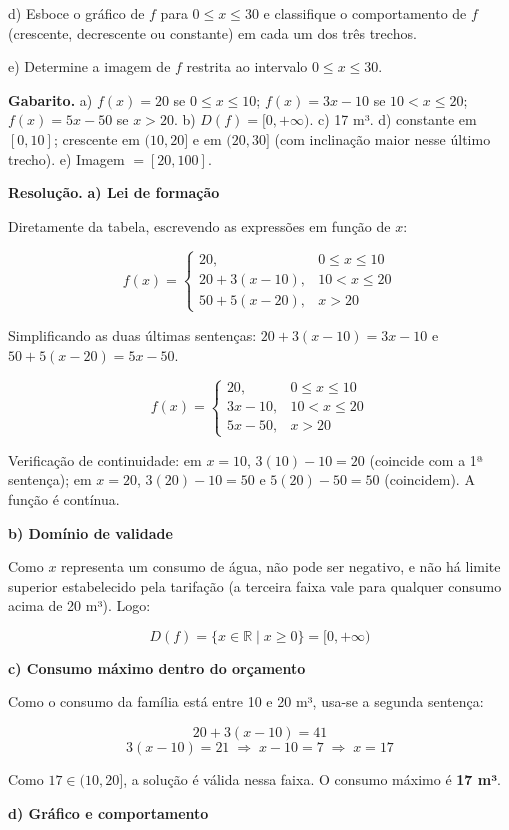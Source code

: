 \documentclass[11pt,a4paper]{article}
\begin{document}
d) Esboce o gráfico de $f$ para $0 \le x \le 30$ e classifique o comportamento de $f$ (crescente, decrescente ou constante) em cada um dos três trechos.

e) Determine a imagem de $f$ restrita ao intervalo $0 \le x \le 30$.

\textbf{Gabarito.} a) $f(x)=20$ se $0\le x\le 10$; $f(x)=3x-10$ se $10<x\le 20$; $f(x)=5x-50$ se $x>20$. b) $D(f)=[0,+\infty)$. c) 17 m³. d) constante em $[0,10]$; crescente em $(10,20]$ e em $(20,30]$ (com inclinação maior nesse último trecho). e) Imagem $=[20,100]$.

\textbf{Resolução.} \textbf{a) Lei de formação}

Diretamente da tabela, escrevendo as expressões em função de $x$:

$$f(x)=\begin{cases}20, & 0\le x\le 10\\[2pt] 20+3(x-10), & 10< x\le 20\\[2pt] 50+5(x-20), & x> 20\end{cases}$$

Simplificando as duas últimas sentenças: $20+3(x-10)=3x-10$ e $50+5(x-20)=5x-50$.

$$f(x)=\begin{cases}20, & 0\le x\le 10\\ 3x-10, & 10< x\le 20\\ 5x-50, & x> 20\end{cases}$$

Verificação de continuidade: em $x=10$, $3(10)-10=20$ (coincide com a 1ª sentença); em $x=20$, $3(20)-10=50$ e $5(20)-50=50$ (coincidem). A função é contínua.

\textbf{b) Domínio de validade}

Como $x$ representa um consumo de água, não pode ser negativo, e não há limite superior estabelecido pela tarifação (a terceira faixa vale para qualquer consumo acima de 20 m³). Logo:

$$D(f) = \{x \in \mathbb{R} \mid x \ge 0\} = [0, +\infty)$$

\textbf{c) Consumo máximo dentro do orçamento}

Como o consumo da família está entre 10 e 20 m³, usa-se a segunda sentença:

$$20+3(x-10)=41$$
$$3(x-10)=21 \;\Rightarrow\; x-10=7 \;\Rightarrow\; x=17$$

Como $17 \in (10,20]$, a solução é válida nessa faixa. O consumo máximo é \textbf{17 m³}.

\textbf{d) Gráfico e comportamento}
\end{document}
